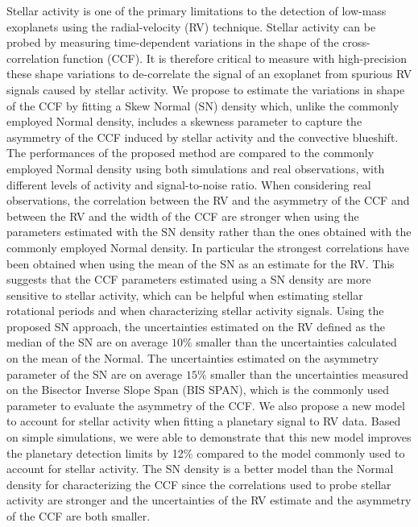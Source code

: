 \documentclass{aa}
\begin{document}
%
{Stellar activity is one of the primary limitations to the detection of low-mass exoplanets using the radial-velocity (RV) technique. 
Stellar activity can be probed by measuring time-dependent variations in the shape of the cross-correlation function (CCF). It is therefore 
critical to measure with high-precision these shape variations to de-correlate the signal of an exoplanet from spurious RV signals caused 
by stellar activity.}
%
{We propose to estimate the variations in shape of the CCF by fitting a Skew Normal (SN) density which, unlike the commonly employed Normal density, includes a skewness parameter to capture the asymmetry of the CCF induced by stellar activity and the convective blueshift.
}
%
{The performances of the proposed method are compared to the commonly employed Normal density using both simulations and real observations, with different levels of activity and signal-to-noise ratio.}
%
{When considering real observations, the correlation between the RV and the asymmetry of the CCF and between the RV and the width of the CCF are stronger when using the parameters estimated with the SN density rather than the ones obtained with the commonly employed Normal density. 
In particular the strongest correlations have been obtained when using the mean of the SN as an estimate for the RV. 
This suggests that the CCF parameters estimated using a SN density are more sensitive to stellar activity, which can be helpful 
when estimating stellar rotational periods and when characterizing stellar activity signals.
Using the proposed SN approach, the uncertainties estimated on the RV defined as the median of the SN are on average $10\%$ smaller than the uncertainties calculated on the mean of the Normal. 
The uncertainties estimated on the asymmetry parameter of the SN are on average $15\%$ smaller than the uncertainties measured on the Bisector Inverse Slope Span (BIS SPAN), which is the commonly used parameter to evaluate the asymmetry of the CCF. 
We also propose a new model to account for stellar activity when fitting a planetary signal to RV data.
Based on simple simulations, we were able to demonstrate that this new model improves the planetary detection limits by 12\% 
compared to the model commonly used to account for stellar activity.
}
%
{The SN density is a better model than the Normal density for characterizing the CCF since the correlations used to probe stellar activity are stronger and the uncertainties of the RV estimate and the asymmetry of the CCF are both smaller.
}
\end{document}
